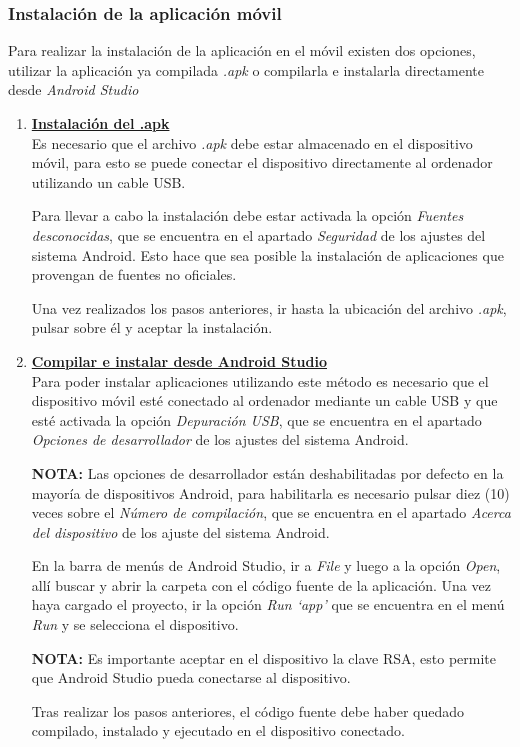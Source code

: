 \documentclass[12pt, twoside]{article}
\begin{document}
        \subsubsection{Instalación de la aplicación móvil}
            Para realizar la instalación de la aplicación en el móvil existen dos opciones, utilizar la aplicación ya compilada \textit{.apk} o compilarla e instalarla directamente desde \textit{Android Studio}
            
            \begin{enumerate}
                \item \textbf{\underline{Instalación del .apk}} \\
                Es necesario que el archivo \textit{.apk} debe estar almacenado en el dispositivo móvil, para esto se puede conectar el dispositivo directamente al ordenador utilizando un cable USB.

                Para llevar a cabo la instalación debe estar activada la opción \textit{Fuentes desconocidas}, que se encuentra en el apartado \textit{Seguridad} de los ajustes del sistema Android. Esto hace que sea posible la instalación de aplicaciones que provengan de fuentes no oficiales.

                Una vez realizados los pasos anteriores, ir hasta la ubicación del archivo \textit{.apk}, pulsar sobre él y aceptar la instalación.

                \item \textbf{\underline{Compilar e instalar desde Android Studio}} \\
                Para poder instalar aplicaciones utilizando este método es necesario que el dispositivo móvil esté conectado al ordenador mediante un cable USB y que esté activada la opción \textit{Depuración USB}, que se encuentra en el apartado \textit{Opciones de desarrollador} de los ajustes del sistema Android.

                \textbf{NOTA:} Las opciones de desarrollador están deshabilitadas por defecto en la mayoría de dispositivos Android, para habilitarla es necesario pulsar diez (10) veces sobre el \textit{Número de compilación}, que se encuentra en el apartado \textit{Acerca del dispositivo} de los ajuste del sistema Android.

                En la barra de menús de Android Studio, ir a \textit{File} y luego a la opción \textit{Open}, allí buscar y abrir la carpeta con el código fuente de la aplicación. Una vez haya cargado el proyecto, ir la opción \textit{Run `app'} que se encuentra en el menú \textit{Run} y se selecciona el dispositivo.
                
                \textbf{NOTA:} Es importante aceptar en el dispositivo la clave RSA, esto permite que Android Studio pueda conectarse al dispositivo.

                Tras realizar los pasos anteriores, el código fuente debe haber quedado compilado, instalado y ejecutado en el dispositivo conectado.
            \end{enumerate}
\end{document}

